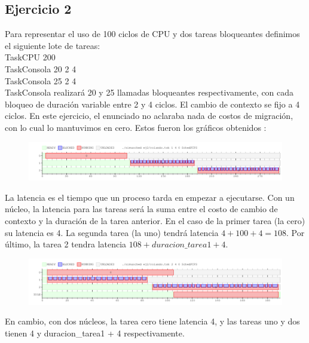 \subsection{Ejercicio 2}

Para representar el uso de 100 ciclos de CPU y dos tareas bloqueantes definimos el siguiente lote de tareas:\\

TaskCPU 200 \\
TaskConsola 20 2 4\\
TaskConsola 25 2 4\\

TaskConsola realizará 20 y 25 llamadas bloqueantes respectivamente, con cada bloqueo de duración variable entre 2 y 4 ciclos. El cambio de contexto se fijo a 4 ciclos. En este ejercicio, el enunciado no aclaraba nada de costos de migración, con lo cual lo mantuvimos en cero. Estos fueron los gráficos obtenidos :



\begin{figure}[h]
  \includegraphics[width=\textwidth]{../ej2/uncore.png}
  \caption{}
\end{figure}

La latencia es el tiempo que un proceso tarda en empezar a ejecutarse. Con un núcleo, la latencia para las tareas será la suma entre el costo de cambio de contexto y la duración de la tarea anterior. En el caso de la primer tarea (la cero) su latencia es 4. La segunda tarea (la uno) tendrá latencia $ 4 + 100 + 4 = 108$. Por último, la tarea 2 tendra latencia $ 108 + duracion\_tarea1 + 4$.



\begin{figure}[h]
  \includegraphics[width=\textwidth]{../ej2/doscores.png}
  \caption{}
\end{figure}

En cambio, con dos núcleos, la tarea cero tiene latencia 4, y las tareas uno y dos tienen 4 y duracion\_tarea1 + 4 respectivamente.

